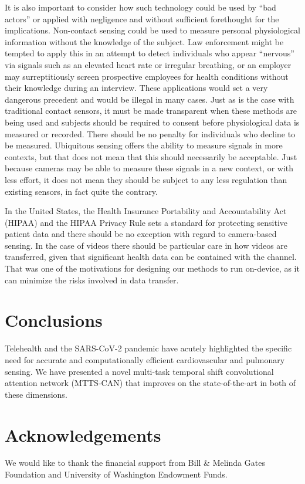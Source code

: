 \documentclass{article}
\begin{document}
It is also important to consider how such technology could be used by ``bad actors'' or applied with negligence and without sufficient forethought for the implications. Non-contact sensing could be used to measure personal physiological information without the knowledge of the subject. Law enforcement might be tempted to apply this in an attempt to detect individuals who appear ``nervous'' via signals such as an elevated heart rate or irregular breathing, or an employer may surreptitiously screen prospective employees for health conditions without their knowledge during an interview. These applications would set a very dangerous precedent and would be illegal in many cases. Just as is the case with traditional contact sensors, it must be made transparent when these methods are being used and subjects should be required to consent before physiological data is measured or recorded. There should be no penalty for individuals who decline to be measured.  Ubiquitous sensing offers the ability to measure signals in more contexts, but that does not mean that this should necessarily be acceptable. Just because cameras may be able to measure these signals in a new context, or with less effort, it does not mean they should be subject to any less regulation than existing sensors, in fact quite the contrary.

In the United States, the Health Insurance Portability and Accountability Act (HIPAA) and the HIPAA Privacy Rule sets a standard for protecting sensitive patient data and there should be no exception with regard to camera-based sensing. In the case of videos there should be particular care in how videos are transferred, given that significant health data can be contained with the channel. That was one of the motivations for designing our methods to run on-device, as it can minimize the risks involved in data transfer.  

\section{Conclusions}

Telehealth and the SARS-CoV-2 pandemic have acutely highlighted the specific need for accurate and computationally efficient cardiovascular and pulmonary sensing. We have presented a novel multi-task temporal shift convolutional attention network (MTTS-CAN) that improves on the state-of-the-art in both of these dimensions. 


\section{Acknowledgements}
We would like to thank the financial support from Bill \& Melinda Gates Foundation and University of Washington Endowment Funds. 
\end{document}

